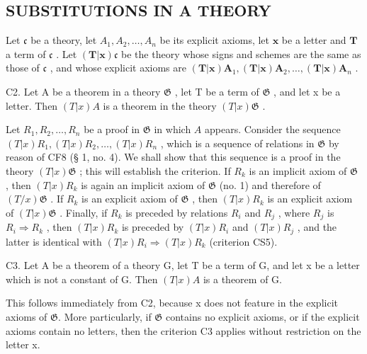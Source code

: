 \subsection{SUBSTITUTIONS IN A THEORY}

Let \(\mathfrak{c}\) be a theory, let \(A_{1}, A_{2}, \ldots, A_{n}\) be its explicit axioms, let \(\pmb{x}\) be a letter and \(\pmb{T}\) a term of \(\mathfrak{c}\) . Let \((\pmb{T}|\pmb{x})\mathfrak{c}\) be the theory whose signs and schemes are the same as those of \(\mathfrak{c}\) , and whose explicit axioms are \((\pmb{T}|\pmb{x})\pmb{A}_{1}, (\pmb{T}|\pmb{x})\pmb{A}_{2}, \ldots, (\pmb{T}|\pmb{x})\pmb{A}_{n}\) .

C2. Let A be a theorem in a theory \(\mathfrak{G}\) , let T be a term of \(\mathfrak{G}\) , and let x be a letter. Then \((T|x)A\) is a theorem in the theory \((T|x)\mathfrak{G}\) .

Let \(R_1, R_2, \ldots, R_n\) be a proof in \(\mathfrak{G}\) in which \(A\) appears. Consider the sequence \((T|x)R_1, (T|x)R_2, \ldots, (T|x)R_n\) , which is a sequence of relations in \(\mathfrak{G}\) by reason of CF8 (§ 1, no. 4). We shall show that this sequence is a proof in the theory \((T|x)\mathfrak{G}\) ; this will establish the criterion. If \(R_k\) is an implicit axiom of \(\mathfrak{G}\) , then \((T|x)R_k\) is again an implicit axiom of \(\mathfrak{G}\) (no. 1) and therefore of \((T/x)\mathfrak{G}\) . If \(R_k\) is an explicit axiom of \(\mathfrak{G}\) , then \((T|x)R_k\) is an explicit axiom of \((T|x)\mathfrak{G}\) . Finally, if \(R_k\) is preceded by relations \(R_i\) and \(R_j\) , where \(R_j\) is \(R_i \Longrightarrow R_k\) , then \((T|x)R_k\) is preceded by \((T|x)R_i\) and \((T|x)R_j\) , and the latter is identical with \((T|x)R_i \Longrightarrow (T|x)R_k\) (criterion CS5).

C3. Let A be a theorem of a theory G, let T be a term of G, and let x be a letter which is not a constant of G. Then \((T|x)A\) is a theorem of G.

This follows immediately from C2, because x does not feature in the explicit axioms of \(\mathfrak{G}\). More particularly, if \(\mathfrak{G}\) contains no explicit axioms, or if the explicit axioms contain no letters, then the criterion C3 applies without restriction on the letter x.

